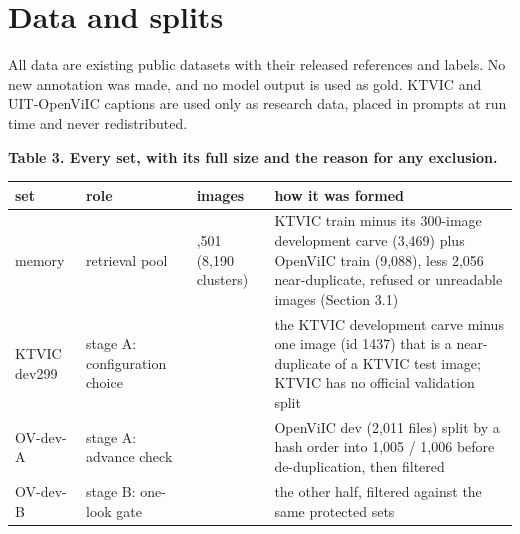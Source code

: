 \section{Data and splits}\label{data-and-splits}

All data are existing public datasets with their released references and labels. No new annotation
was made, and no model output is used as gold. KTVIC and UIT-OpenViIC captions are used only as
research data, placed in prompts at run time and never redistributed.

\textbf{Table 3. Every set, with its full size and the reason for any exclusion.}

\begin{longtable}[]{@{}
  >{\raggedright\arraybackslash}p{}
  >{\raggedright\arraybackslash}p{}
  >{\raggedright\arraybackslash}p{}
  >{\raggedright\arraybackslash}p{}@{}}
\toprule\noalign{}
\begin{minipage}[b]{\linewidth}\raggedright
set
\end{minipage} & \begin{minipage}[b]{\linewidth}\raggedright
role
\end{minipage} & \begin{minipage}[b]{\linewidth}\raggedright
images
\end{minipage} & \begin{minipage}[b]{\linewidth}\raggedright
how it was formed
\end{minipage} \\
\midrule\noalign{}
\endhead
\bottomrule\noalign{}
\endlastfoot
memory & retrieval pool & 10,501 (8,190 clusters) & KTVIC train minus its 300-image development
carve (3,469) plus OpenViIC train (9,088), less 2,056 near-duplicate, refused or unreadable images
(Section 3.1) \\
KTVIC dev299 & stage A: configuration choice & 299 & the KTVIC development carve minus one image (id
1437) that is a near-duplicate of a KTVIC test image; KTVIC has no official validation split \\
OV-dev-A & stage A: advance check & 911 & OpenViIC dev (2,011 files) split by a hash order into
1,005 / 1,006 before de-duplication, then filtered \\
OV-dev-B & stage B: one-look gate & 925 & the other half, filtered against the same protected
sets \\

\end{longtable}
